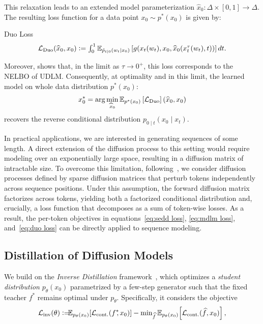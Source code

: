  This relaxation leads to an extended model parameterization $\widehat{x}_0 \colon \Delta \times [0, 1] \to \Delta$. The resulting loss function for a data point $x_0 \sim p^*(x_0)$ is given by:
  \begin{Box1}{Duo Loss}
    \vspace{-8pt}
    \begin{gather}
    \label{eq:duo loss}
      \textstyle \mathcal{L}_{\text{Duo}}(\widehat{x}_0, x_0) \vcentcolon= \int_0^1 \mathbb{E}_{\tilde{p}_{t\mid 0}(w_t\mid x_0)} \left[g(x_t(w_t),x_0, \widehat{x}_0(x_t^{\tau}(w_t), t))\right]dt.
    \end{gather}
  \end{Box1}
  Moreover, \citet{sahoo2025the} shows that, in the limit as $\tau \to 0^{+}$, this loss corresponds to the NELBO of UDLM. Consequently, at optimality and in this limit, the learned model on whole data distribution $p^*(x_0)$:
  \[
    x_0^* = \arg\min_{\widehat{x}_0} \mathbb{E}_{p^*(x_0)}\left[\mathcal{L}_{\text{Duo}}\right](\widehat{x}_0, x_0)
  \]
  recovers the reverse conditional distribution $p_{0\mid t}(x_0 \mid x_t).$
  
  In practical applications, we are interested in generating sequences of some length. A direct extension of the diffusion process to this setting would require modeling over an exponentially large space, resulting in a diffusion matrix of intractable size. To overcome this limitation, following~\citep{lou2024discrete}, we consider diffusion processes defined by sparse diffusion matrices that perturb tokens independently across sequence positions. Under this assumption, the forward diffusion matrix factorizes across tokens, yielding both a factorized conditional distribution and, crucially, a loss function that decomposes as a sum of token-wise losses. As a result, the per-token objectives in equations~\eqref{eq:sedd loss}, \eqref{eq:mdlm loss}, and~\eqref{eq:duo loss} can be directly applied to sequence modeling.

\vspace{-1mm}
\subsection{Distillation of Diffusion Models} 
\vspace{-2mm}
  We build on the \emph{Inverse Distillation} framework~\citep{gushchin2025inverse, kornilov2025universal}, which optimizes a \emph{student distribution} $p_\theta(x_0)$ parametrized by a few-step generator such that the fixed teacher $f^*$ remains optimal under $p_\theta$. Specifically, it considers the objective
  \begin{gather}
   \LC_{\text{inv}}(\theta) \vcentcolon= \!\!\! \EE_{p_{\theta}(x_0)} \!\left[\LC_{\text{cont.}}(f^*\!\!, x_0)\right]  - \min\nolimits_{\widehat{f}} \EE_{p_{\theta}(x_0)} \! \left[\LC_{\text{cont.}}(\widehat{f}, x_0)\right],
  \label{eq:inverse optimization problem}
    \vspace{-1mm}
  \end{gather}

